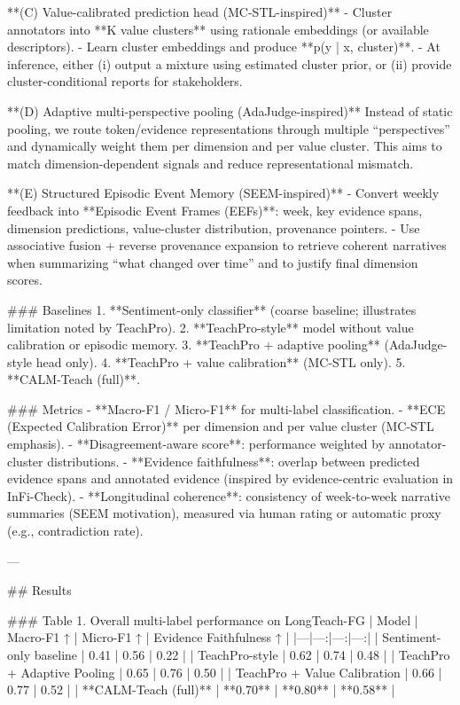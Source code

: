 **(C) Value-calibrated prediction head (MC-STL-inspired)**  
- Cluster annotators into **K value clusters** using rationale embeddings (or available descriptors).  
- Learn cluster embeddings and produce **p(y | x, cluster)**.  
- At inference, either (i) output a mixture using estimated cluster prior, or (ii) provide cluster-conditional reports for stakeholders.

**(D) Adaptive multi-perspective pooling (AdaJudge-inspired)**  
Instead of static pooling, we route token/evidence representations through multiple “perspectives” and dynamically weight them per dimension and per value cluster. This aims to match dimension-dependent signals and reduce representational mismatch.

**(E) Structured Episodic Event Memory (SEEM-inspired)**  
- Convert weekly feedback into **Episodic Event Frames (EEFs)**: {week, key evidence spans, dimension predictions, value-cluster distribution, provenance pointers}.  
- Use associative fusion + reverse provenance expansion to retrieve coherent narratives when summarizing “what changed over time” and to justify final dimension scores.

### Baselines  
1. **Sentiment-only classifier** (coarse baseline; illustrates limitation noted by TeachPro).  
2. **TeachPro-style** model without value calibration or episodic memory.  
3. **TeachPro + adaptive pooling** (AdaJudge-style head only).  
4. **TeachPro + value calibration** (MC-STL only).  
5. **CALM-Teach (full)**.

### Metrics  
- **Macro-F1 / Micro-F1** for multi-label classification.  
- **ECE (Expected Calibration Error)** per dimension and per value cluster (MC-STL emphasis).  
- **Disagreement-aware score**: performance weighted by annotator-cluster distributions.  
- **Evidence faithfulness**: overlap between predicted evidence spans and annotated evidence (inspired by evidence-centric evaluation in InFi-Check).  
- **Longitudinal coherence**: consistency of week-to-week narrative summaries (SEEM motivation), measured via human rating or automatic proxy (e.g., contradiction rate).

---

## Results  

### Table 1. Overall multi-label performance on LongTeach-FG  
| Model | Macro-F1 ↑ | Micro-F1 ↑ | Evidence Faithfulness ↑ |
|---|---:|---:|---:|
| Sentiment-only baseline | 0.41 | 0.56 | 0.22 |
| TeachPro-style | 0.62 | 0.74 | 0.48 |
| TeachPro + Adaptive Pooling | 0.65 | 0.76 | 0.50 |
| TeachPro + Value Calibration | 0.66 | 0.77 | 0.52 |
| **CALM-Teach (full)** | **0.70** | **0.80** | **0.58** |

